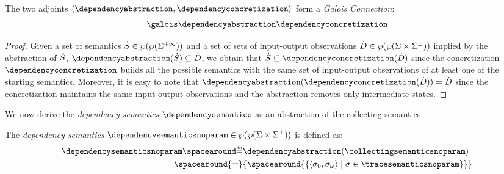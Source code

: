 \begin{theorem}
The two adjoints $\tuple{\dependencyabstraction}{\dependencyconcretization}$ form a \emph{Galois Connection}:
\begin{align*}
  \galoisbetweensemantics{collecting}{dependency}
\end{align*}
\end{theorem}
\begin{proof}
  Given a set of semantics $\dot{S}\in\wp(\wp(\Sigma^{+\infty}))$ and a set of sets of input-output observations $\dot{D}\in\wp(\wp(\Sigma\times\Sigma^\bot))$ implied by the abstraction of $\dot{S}$, $\dependencyabstraction(\defsetofsetoftraces)\subseteq \defsetofsetofdependencies$, we obtain that $\defsetofsetoftraces\subseteq\dependencyconcretization(\defsetofsetofdependencies)$ since the concretization $\dependencyconcretization$ builds all the possible semantics with the same set of input-output observations of at least one of the starting semantics.
  Moreover, it is easy to note that $\dependencyabstraction(\dependencyconcretization(\defsetofsetofdependencies)) = \defsetofsetofdependencies$ since the concretization maintains the same input-output observations and the abstraction removes only intermediate states.
\end{proof}

We now derive the \emph{dependency semantics} $\dependencysemantics$ as an abstraction of the collecting semantics.

\begin{definition}
  The \emph{dependency semantics} $\dependencysemanticsnoparam\in\dependencytype$ is defined as:
  \begin{align*}
    \dependencysemanticsnoparam\DefeQ& \dependencyabstraction(\collectingsemanticsnoparam) \\
    \spacearound{=}& \{\spacearound{\setdef{\inputoutputtuple{\deftrace}}{\deftrace \in \tracesemanticsnoparam}}\}
  \end{align*}
\end{definition}

